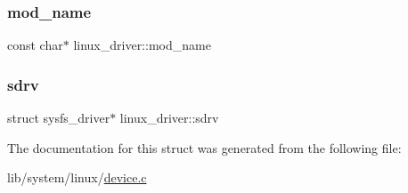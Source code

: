 \mbox{\label{structlinux__driver_aa37549bd63322adbfd14e9d5f0c9bb9d}} 
\subsubsection{\texorpdfstring{mod\+\_\+name}{mod\_name}}
{\footnotesize\ttfamily const char$\ast$ linux\+\_\+driver\+::mod\+\_\+name}

\mbox{\label{structlinux__driver_afce51f414c82ebf42eb22d778609bf8b}} 
\subsubsection{\texorpdfstring{sdrv}{sdrv}}
{\footnotesize\ttfamily struct sysfs\+\_\+driver$\ast$ linux\+\_\+driver\+::sdrv}



The documentation for this struct was generated from the following file\+:\begin{DoxyCompactItemize}
\item 
lib/system/linux/\hyperlink{system_2linux_2device_8c}{device.\+c}\end{DoxyCompactItemize}
